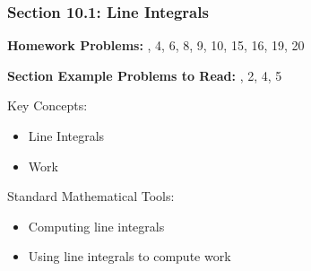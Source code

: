 %
% 

\begin{frame}
\frametitle{\Large {\color[rgb]{0.02,0.20,1.0} Section 10.1: Line Integrals}}
\scriptsize

\vspace{0.2cm}
{\bf Homework Problems:} , 4, 6, 8, 9, 10, 15, 16, 19, 20

\vspace{0.2cm}

{\bf Section Example Problems to Read:} , 2, 4, 5

\vspace{0.8cm}

\begin{block}{Key Concepts:}
\begin{itemize}
	\item[...] Line Integrals
	\item[...] Work
\end{itemize}
\end{block}

\begin{block}{Standard Mathematical Tools:}
\begin{itemize}
	\item[...] Computing line integrals
	\item[...] Using line integrals to compute work
\end{itemize}
\end{block}

\end{frame}


